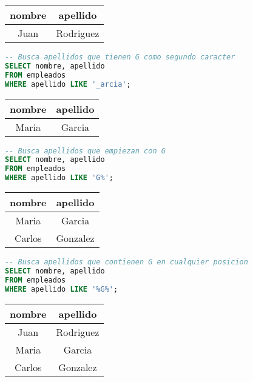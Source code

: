 \documentclass[12pt]{article}
\begin{document}
\begin{center}
\begin{tabular}{cc}
\toprule
nombre & apellido \\
\midrule
Juan & Rodriguez \\
\bottomrule
\end{tabular}
\end{center}

\begin{lstlisting}[language=SQL]
-- Busca apellidos que tienen G como segundo caracter
SELECT nombre, apellido
FROM empleados
WHERE apellido LIKE '_arcia';
\end{lstlisting}

\begin{center}
\begin{tabular}{cc}
\toprule
nombre & apellido \\
\midrule
Maria & Garcia \\
\bottomrule
\end{tabular}
\end{center}

\begin{lstlisting}[language=SQL]
-- Busca apellidos que empiezan con G
SELECT nombre, apellido
FROM empleados
WHERE apellido LIKE 'G%';
\end{lstlisting}

\begin{center}
\begin{tabular}{cc}
\toprule
nombre & apellido \\
\midrule
Maria & Garcia \\
Carlos & Gonzalez \\
\bottomrule
\end{tabular}
\end{center}

\begin{lstlisting}[language=SQL]
-- Busca apellidos que contienen G en cualquier posicion
SELECT nombre, apellido
FROM empleados
WHERE apellido LIKE '%G%';
\end{lstlisting}

\begin{center}
\begin{tabular}{cc}
\toprule
nombre & apellido \\
\midrule
Juan & Rodriguez \\
Maria & Garcia \\
Carlos & Gonzalez \\
\bottomrule
\end{tabular}
\end{center}
\end{document}
